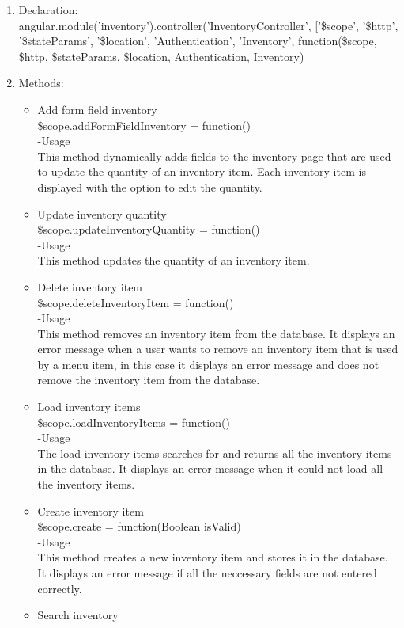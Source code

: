 \documentclass[a4paper,12pt]{article}
\begin{document}
\begin{enumerate}
\item Declaration:\\angular.module('inventory').controller('InventoryController', ['\$scope', '\$http', '\$stateParams', '\$location', 'Authentication', 'Inventory',
	function(\$scope, \$http, \$stateParams, \$location, Authentication, Inventory)
\item Methods:
	\begin{itemize}
	\item Add form field inventory\\
  \$scope.addFormFieldInventory = function()\\
  -Usage\\
  This method dynamically adds fields to the inventory page that are used to update the quantity of an inventory item. Each inventory item is displayed with the option to edit the quantity.
\item  Update inventory quantity\\
 \$scope.updateInventoryQuantity = function()\\
 -Usage\\
 This method updates the quantity of an inventory item.
 \item Delete inventory item\\
  \$scope.deleteInventoryItem = function()\\
  -Usage\\
  This method removes an inventory item from the database. It displays an error message when a user wants to remove an inventory item that is used by a menu item, in this case it displays an error message and does not remove the inventory item from the database.
  \item Load inventory items\\
   \$scope.loadInventoryItems = function()\\
   -Usage\\
   The load inventory items searches for and returns all the inventory items in the database. It displays an error message when it could not load all the inventory items.
   \item Create inventory item\\
    \$scope.create = function(Boolean isValid)\\
    -Usage\\
    This method creates a new inventory item and stores it in the database. It displays an error message if all the neccessary fields are not entered correctly. 
    \item Search inventory\\

\end{itemize}
\end{enumerate}
\end{document}
